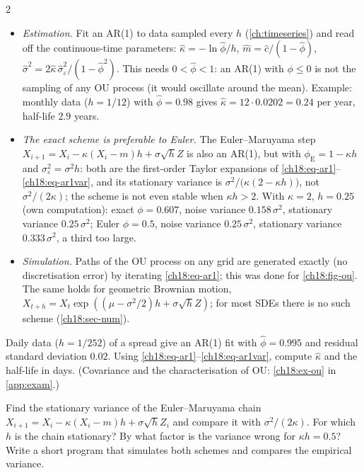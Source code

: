 \begin{paracol}{2}
\begin{itemize}
  \item \emph{Estimation.} Fit an AR(1) to data sampled every $h$ (\cref{ch:timeseries}) and read off the continuous-time parameters: $\hat\kappa=-\ln\hat\phi/h$, $\hat m=\hat c/(1-\hat\phi)$, $\hat\sigma^2=2\hat\kappa\,\hat\sigma_\varepsilon^2/(1-\hat\phi^2)$. This needs $0<\hat\phi<1$: an AR(1) with $\phi\le0$ is not the sampling of any OU process (it would oscillate around the mean). Example: monthly data ($h=1/12$) with $\hat\phi=0.98$ gives $\hat\kappa=12\cdot0.0202=0.24$ per year, half-life $2.9$ years.
  \item \emph{The exact scheme is preferable to Euler.} The Euler--Maruyama step $X_{i+1}=X_i-\kappa(X_i-m)h+\sigma\sqrt hZ$ is also an AR(1), but with $\phi_{\mathrm{E}}=1-\kappa h$ and $\sigma_\varepsilon^2=\sigma^2h$: both are the first-order Taylor expansions of \eqref{ch18:eq-ar1}--\eqref{ch18:eq-ar1var}, and its stationary variance is $\sigma^2/\bigl(\kappa(2-\kappa h)\bigr)$, not $\sigma^2/(2\kappa)$; the scheme is not even stable when $\kappa h>2$. With $\kappa=2$, $h=0.25$ (own computation): exact $\phi=0.607$, noise variance $0.158\,\sigma^2$, stationary variance $0.25\,\sigma^2$; Euler $\phi=0.5$, noise variance $0.25\,\sigma^2$, stationary variance $0.333\,\sigma^2$, a third too large.
  \item \emph{Simulation.} Paths of the OU process on any grid are generated exactly (no discretisation error) by iterating \eqref{ch18:eq-ar1}; this was done for \cref{ch18:fig-ou}. The same holds for geometric Brownian motion, $X_{t+h}=X_t\exp((\mu-\sigma^2/2)h+\sigma\sqrt hZ)$; for most SDEs there is no such scheme (\cref{ch18:sec-num}).
\end{itemize}

\begin{exercise}\label{ch18:ex-ou-short}
Daily data ($h=1/252$) of a spread give an AR(1) fit with $\hat\phi=0.995$ and residual standard deviation $0.02$. Using \eqref{ch18:eq-ar1}--\eqref{ch18:eq-ar1var}, compute $\hat\kappa$ and the half-life in days. (Covariance and the characterisation of OU: \cref{ch18:ex-ou} in \cref{app:exam}.)
\end{exercise}

\begin{exercise}\label{ch18:ex-euler}
Find the stationary variance of the Euler--Maruyama chain $X_{i+1}=X_i-\kappa(X_i-m)h+\sigma\sqrt hZ_i$ and compare it with $\sigma^2/(2\kappa)$. For which $h$ is the chain stationary? By what factor is the variance wrong for $\kappa h=0.5$? Write a short program that simulates both schemes and compares the empirical variance.
\end{exercise}


\end{paracol}
